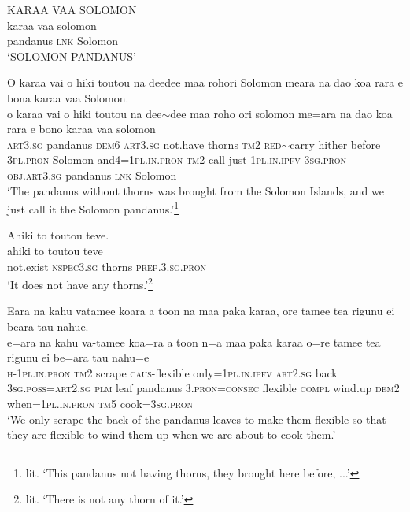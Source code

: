 \ea\label{ex:text9-16}
KARAA VAA SOLOMON\\
\gll karaa	vaa	solomon\\
     pandanus	\textsc{lnk}	Solomon\\
\glt `SOLOMON PANDANUS'
\z

\newpage
\ea\label{ex:text9-17}
O karaa vai o hiki toutou na deedee maa rohori Solomon meara na dao koa rara e bona karaa vaa Solomon.\\
\gll o	karaa	vai	o	hiki	toutou	na	dee{$\sim$}dee	maa	roho	ori	solomon	me=ara	na	dao	koa	rara	e	bono	karaa	vaa	solomon\\
     \textsc{art}3.\textsc{sg}	pandanus	\textsc{dem}6	\textsc{art}3.\textsc{sg}	not.have	thorns	\textsc{tm}2	\textsc{red}{$\sim$}carry	hither	before	3\textsc{pl}.\textsc{pron}	Solomon	and4=1\textsc{pl}.\textsc{in}.\textsc{pron}	\textsc{tm}2	call	just	1\textsc{pl}.\textsc{in}.\textsc{ipfv}	3\textsc{sg}.\textsc{pron}	\textsc{obj}.\textsc{art}3.\textsc{sg}	pandanus	\textsc{lnk}	Solomon\\
\glt `The pandanus without thorns was brought from the Solomon Islands, and we just call it the Solomon pandanus.'\footnote{lit. `This pandanus not having thorns, they brought here before, ...'}
\z

\ea\label{ex:text9-18}
Ahiki to toutou teve.\\
\gll ahiki	to	toutou	teve\\
     not.exist	\textsc{nspec}3.\textsc{sg}	thorns	\textsc{prep}.3.\textsc{sg}.\textsc{pron}\\
\glt `It does not have any thorns.'\footnote{lit. `There is not any thorn of it.'}
\z

\ea\label{ex:text9-19}
Eara na kahu vatamee koara a toon na maa paka karaa, ore tamee tea rigunu ei beara tau nahue.\\
\gll e=ara	na	kahu	va-tamee	koa=ra	a	toon	n=a	maa	paka	karaa	o=re	tamee	tea	rigunu	ei	be=ara	tau	nahu=e\\
     \textsc{h}-1\textsc{pl}.\textsc{in}.\textsc{pron}	\textsc{tm}2	scrape	\textsc{caus}-flexible	only=1\textsc{pl}.\textsc{in}.\textsc{ipfv}	\textsc{art}2.\textsc{sg}	back	3\textsc{sg}.\textsc{poss}=\textsc{art}2.\textsc{sg}	\textsc{plm}	leaf	pandanus	3.\textsc{pron}=\textsc{consec}	flexible	\textsc{compl}	wind.up	\textsc{dem}2	when=1\textsc{pl}.\textsc{in}.\textsc{pron}	\textsc{tm}5	cook=3\textsc{sg}.\textsc{pron}\\
\glt `We only scrape the back of the pandanus leaves to make them flexible so that they are flexible to wind them up when we are about to cook them.'
\z

